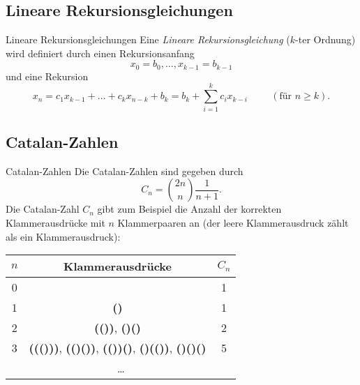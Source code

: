 \documentclass[../../main.tex]{subfiles}
\begin{document}

\subsection{Lineare Rekursionsgleichungen}
\begin{nutshell}{Lineare Rekursionsgleichungen}
    Eine \emph{Lineare Rekursionsgleichung} ($k$-ter Ordnung) wird definiert durch einen Rekursionsanfang
    $$x_0 = b_0, \dots, x_{k-1} = b_{k-1}$$
    und eine Rekursion
    $$x_n = c_1 x_{k-1} + \dots + c_k x_{n-k} + b_k = b_k + \sum_{i=1}^{k} c_ix_{k-i} \hspace{1cm}(\text{für }n \geq k).$$
\end{nutshell}

\subsection{Catalan-Zahlen}
\begin{nutshell}{Catalan-Zahlen}
    Die Catalan-Zahlen sind gegeben durch
    $$C_n = \binom{2n}{n} \frac{1}{n+1}.$$
    Die Catalan-Zahl $C_n$ gibt zum Beispiel die Anzahl der korrekten Klammerausdrücke mit $n$ Klammerpaaren an (der leere Klammerausdruck zählt als ein Klammerausdruck):
    \begin{center}
        \newcommand{\tmp}[2]{\textcolor{#1!80!black}{\textbf{(}#2\textbf{)}}}
        \begin{tabular}{ccc}\toprule
            $n$ & Klammerausdrücke & $C_n$ \\\midrule
            0 & & 1\\
            1 & \tmp{green}{} & 1\\
            2 & \tmp{green}{\tmp{red}{}}, \tmp{green}{}\tmp{red}{} & 2\\
            3 & \tmp{green}{\tmp{red}{\tmp{blue}{}}}, \tmp{green}{\tmp{red}{}\tmp{blue}{}}, \tmp{green}{\tmp{red}{}}\tmp{blue}{}, \tmp{green}{}\tmp{red}{\tmp{blue}{}}, \tmp{green}{}\tmp{red}{}\tmp{blue}{} & 5\\
            \multicolumn{3}{c}{\dots}\\\bottomrule
        \end{tabular}
    \end{center}
\end{nutshell}
\end{document}
